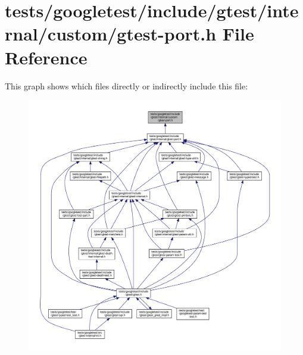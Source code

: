 \hypertarget{custom_2gtest-port_8h}{}\section{tests/googletest/include/gtest/internal/custom/gtest-\/port.h File Reference}
\label{custom_2gtest-port_8h}
This graph shows which files directly or indirectly include this file\+:\nopagebreak
\begin{figure}[H]
\begin{center}
\leavevmode
\includegraphics[width=350pt]{custom_2gtest-port_8h__dep__incl}
\end{center}
\end{figure}

